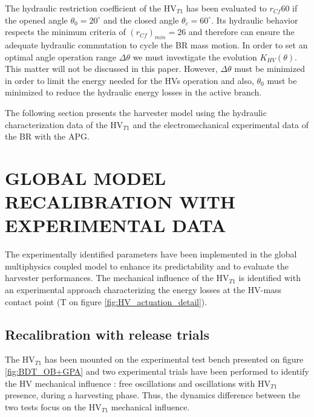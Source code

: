 \documentclass[3p,twocolumn,preprint]{elsarticle}
\begin{document}
The hydraulic restriction coefficient of the HV$_{T1}$ has been evaluated to $r_{Cf}60$ if the opened angle $\theta_0=20^{\circ}$ and the closed angle $\theta_c = 60^{\circ}$. Its hydraulic behavior respects the minimum criteria of \mbox{$(r_{Cf})_{min}=26$} and therefore can ensure the adequate hydraulic commutation to cycle the BR mass motion. In order to set an optimal angle operation range $\Delta\theta$ we must investigate the evolution $K_{HV}(\theta)$. This matter will not be discussed in this paper. However, $\Delta\theta$ must be minimized in order to limit the energy needed for the HVs operation and also, $\theta_0$ must be minimized to reduce the hydraulic energy losses in the active branch.

The following section presents the harvester model using the hydraulic characterization data of the HV$_{T1}$ and the electromechanical experimental data of the BR with the APG.

\section{GLOBAL MODEL RECALIBRATION WITH \mbox{EXPERIMENTAL} DATA}
\label{sec:MODEL RECALIBRATION WITH EXPERIMENTAL DATA}
The experimentally identified parameters have been implemented in the global multiphysics coupled model to enhance its predictability and to evaluate the harvester performances. The mechanical influence of the HV$_{T1}$ is identified with an experimental approach characterizing the energy losses at the HV-mass contact point (T on figure \ref{fig:HV_actuation_detail}). 
	\subsection{Recalibration with release trials}
The HV$_{T1}$ has been mounted on the experimental test bench presented on figure \ref{fig:BDT_OB+GPA} and two experimental trials have been performed to identify the HV mechanical influence : free oscillations and oscillations with HV$_{T1}$ presence, during a harvesting phase. Thus, the dynamics difference between the two tests focus on the HV$_{T1}$ mechanical influence. 
\end{document}
